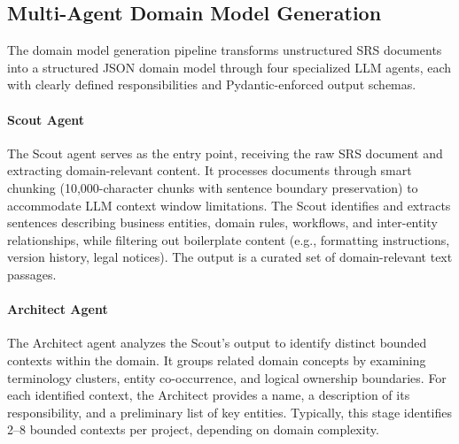 \documentclass[smallextended]{svjour3}
\begin{document}
\subsection{Multi-Agent Domain Model Generation}
\label{sec:arch_pipeline}

The domain model generation pipeline transforms unstructured SRS documents into a structured JSON domain model through four specialized LLM agents, each with clearly defined responsibilities and Pydantic-enforced output schemas.

\paragraph{Scout Agent}
The Scout agent serves as the entry point, receiving the raw SRS document and extracting domain-relevant content.
It processes documents through smart chunking (10,000-character chunks with sentence boundary preservation) to accommodate LLM context window limitations.
The Scout identifies and extracts sentences describing business entities, domain rules, workflows, and inter-entity relationships, while filtering out boilerplate content (e.g., formatting instructions, version history, legal notices).
The output is a curated set of domain-relevant text passages.

\paragraph{Architect Agent}
The Architect agent analyzes the Scout's output to identify distinct bounded contexts within the domain.
It groups related domain concepts by examining terminology clusters, entity co-occurrence, and logical ownership boundaries.
For each identified context, the Architect provides a name, a description of its responsibility, and a preliminary list of key entities.
Typically, this stage identifies 2--8 bounded contexts per project, depending on domain complexity.
\end{document}
